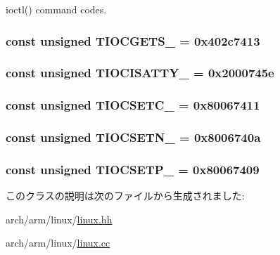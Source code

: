 ioctl() command codes. \hypertarget{classArmLinux64_a5beed2064338286f4e02590b76b2ffde}{
\subsubsection[{TIOCGETS\_\-}]{\setlength{\rightskip}{0pt plus 5cm}const unsigned {\bf TIOCGETS\_\-} = 0x402c7413}}
\label{classArmLinux64_a5beed2064338286f4e02590b76b2ffde}
\hypertarget{classArmLinux64_a2957a5262d4c98a0048b38a33c7094db}{
\subsubsection[{TIOCISATTY\_\-}]{\setlength{\rightskip}{0pt plus 5cm}const unsigned {\bf TIOCISATTY\_\-} = 0x2000745e}}
\label{classArmLinux64_a2957a5262d4c98a0048b38a33c7094db}
\hypertarget{classArmLinux64_a22e252d8cd6a0b19c915466d0da5edea}{
\subsubsection[{TIOCSETC\_\-}]{\setlength{\rightskip}{0pt plus 5cm}const unsigned {\bf TIOCSETC\_\-} = 0x80067411}}
\label{classArmLinux64_a22e252d8cd6a0b19c915466d0da5edea}
\hypertarget{classArmLinux64_a3a5429d636a6a5c2b15d98808bdd1413}{
\subsubsection[{TIOCSETN\_\-}]{\setlength{\rightskip}{0pt plus 5cm}const unsigned {\bf TIOCSETN\_\-} = 0x8006740a}}
\label{classArmLinux64_a3a5429d636a6a5c2b15d98808bdd1413}
\hypertarget{classArmLinux64_a5d98a22b7e576eab9eb1b411fcb7b63a}{
\subsubsection[{TIOCSETP\_\-}]{\setlength{\rightskip}{0pt plus 5cm}const unsigned {\bf TIOCSETP\_\-} = 0x80067409}}
\label{classArmLinux64_a5d98a22b7e576eab9eb1b411fcb7b63a}


このクラスの説明は次のファイルから生成されました:\begin{DoxyCompactItemize}
\item 
arch/arm/linux/\hyperlink{arch_2arm_2linux_2linux_8hh}{linux.hh}\item 
arch/arm/linux/\hyperlink{arch_2arm_2linux_2linux_8cc}{linux.cc}\end{DoxyCompactItemize}
